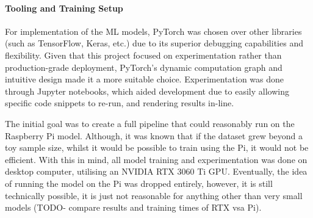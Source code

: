             \paragraph{Tooling and Training Setup}
    
            For implementation of the ML models, PyTorch was chosen over other libraries (such as TensorFlow, Keras, etc.) due to its superior debugging capabilities and flexibility. Given that this project focused on experimentation rather than production-grade deployment, PyTorch's dynamic computation graph and intuitive design made it a more suitable choice. Experimentation was done through Jupyter notebooks, which aided development due to easily allowing specific code snippets to re-run, and rendering results in-line.
    
            The initial goal was to create a full pipeline that could reasonably run on the Raspberry Pi model. Although, it was known that if the dataset grew beyond a toy sample size, whilst it would be possible to train using the Pi, it would not be efficient. With this in mind, all model training and experimentation was done on desktop computer, utilising an NVIDIA RTX 3060 Ti GPU. Eventually, the idea of running the model on the Pi was dropped entirely, however, it is still technically possible, it is just not reasonable for anything other than very small models (TODO- compare results and training times of RTX vsa Pi).
    
